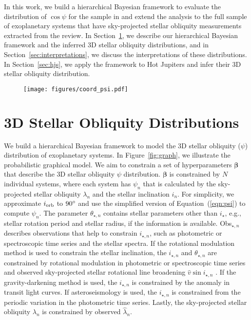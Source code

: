 \documentclass[twocolumn,times]{aastex631}
\begin{document}
In this work, we build a hierarchical Bayesian framework to evaluate the distribution of $\cos{\psi}$ for the sample in \cite{Albrecht21} and extend the analysis to the full sample of exoplanetary systems that have sky-projected stellar obliquity measurements extracted from the \cite{Albrecht22} review.
In Section~\ref{sec:hbm}, we describe our hierarchical Bayesian framework and the inferred 3D stellar obliquity distributions, and in Section~\ref{sec:interpretations}, we discuss the interpretations of these distributions. In Section~\ref{sec:hjs}, we apply the framework to Hot Jupiters and infer their 3D stellar obliquity distribution.

\begin{figure}
    \texttt{[image: figures/coord\_psi.pdf]}
    \label{fig:coord_psi}
\end{figure}

\section{3D Stellar Obliquity Distributions} \label{sec:hbm}
We build a hierarchical Bayesian framework to model the 3D stellar obliquity ($\psi$) distribution of exoplanetary systems. In Figure~\ref{fig:graph}, we illustrate the probabilistic graphical model. We aim to constrain a set of hyperparameters $\bm{\beta}$ that describe the 3D stellar obliquity $\psi$ distribution. $\bm{\beta}$ is constrained by $N$ individual systems, where each system has $\psi_n$ that is calculated by the sky-projected stellar obliquity $\lambda_n$ and the stellar inclination $i_n$. For simplicity, we approximate $i_{\rm orb}$ to $90\mbox{$^\circ$}$ and use the simplified version of Equation~(\ref{eqn:psi}) to compute $\psi_n$.
The parameter $\theta_{\star, n}$ contains stellar parameters other than $i_\star$, e.g., stellar rotation period and stellar radius, if the information is available.
Obs$_{\star,n}$ describes observations that help to constrain $i_{\star,n}$, such as photometric or spectroscopic time series and the stellar spectra. If the rotational modulation method is used to constrain the stellar inclination, the $i_{\star,n}$ and $\theta_{\star,n}$ are constrained by rotational modulation in photometric or spectroscopic time series and observed sky-projected stellar rotational line broadening $\hat{v}\sin{i_{\star,n}}$ \citep[e.g.,][]{Masuda20}. If the gravity-darkening method is used, the $i_{\star,n}$ is constrained by the anomaly in transit light curves. If asteroseismology is used, the $i_{\star,n}$ is constrained from the periodic variation in the photometric time series.
Lastly, the sky-projected stellar obliquity $\lambda_n$ is constrained by observed $\hat{\lambda}_n$.
\end{document}
